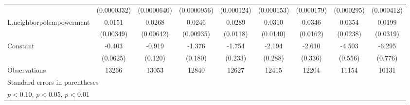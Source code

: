 \begin{table}[htbp]
\begin{tabular}{l*{8}{c}}
                    & (0.0000332)         & (0.0000640)         & (0.0000956)         &  (0.000124)         &  (0.000153)         &  (0.000179)         &  (0.000295)         &  (0.000412)         \\
[1em]
L.neighborpolempowerment&      0.0151\sym{***}&      0.0268\sym{***}&      0.0246\sym{***}&      0.0289\sym{**} &      0.0310\sym{**} &      0.0346\sym{**} &      0.0354         &      0.0199         \\
                    &   (0.00349)         &   (0.00642)         &   (0.00935)         &    (0.0118)         &    (0.0140)         &    (0.0162)         &    (0.0238)         &    (0.0319)         \\
[1em]
Constant            &      -0.403\sym{***}&      -0.919\sym{***}&      -1.376\sym{***}&      -1.754\sym{***}&      -2.194\sym{***}&      -2.610\sym{***}&      -4.503\sym{***}&      -6.295\sym{***}\\
                    &    (0.0625)         &     (0.120)         &     (0.180)         &     (0.233)         &     (0.288)         &     (0.336)         &     (0.556)         &     (0.776)         \\
\hline
Observations        &       13266         &       13053         &       12840         &       12627         &       12415         &       12204         &       11154         &       10131         \\
\hline\hline
\multicolumn{9}{l}{\footnotesize Standard errors in parentheses}\\
\multicolumn{9}{l}{\footnotesize \sym{*} \(p<0.10\), \sym{**} \(p<0.05\), \sym{***} \(p<0.01\)}\\
\end{tabular}
\end{table}
